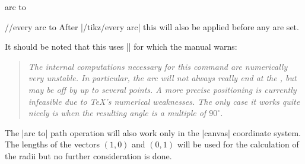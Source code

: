 \begin{pathoperation}{arc to}{}
\begin{multicols}{2}
\begin{stylekey}{/\tikzext/every arc to}
  After |/tikz/every arc| this will also be applied before any  are set.
\end{stylekey}

It should be noted that this uses |\pgfpatharcto| for which the \tikzname\space manual warns:\indexCommandO\pgfpatharcto
\begin{quote}\itshape
    The internal computations necessary for this command are numerically very unstable.
    In particular, the arc will not always really end at the ,
    but may be off by up to several points.
    A more precise positioning is currently infeasible due to \TeX's numerical weaknesses.
    The only case it works quite nicely is when the resulting angle is a multiple of $90^\circ$. 
\end{quote}

The |arc to| path operation will also work only in the |canvas| coordinate system.
The lengths of the vectors $(1, 0)$ and $(0, 1)$ will be used for the calculation of the radii
but no further consideration is done.
\end{multicols}
\end{pathoperation}
